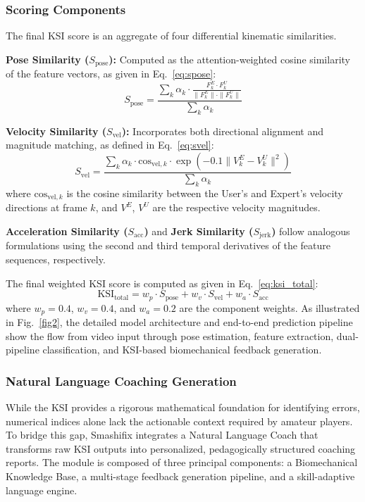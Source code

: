 \documentclass[pdflatex,sn-mathphys-num]{sn-jnl}
\theoremstyle{thmstyleone}%
\theoremstyle{thmstyletwo}%
\theoremstyle{thmstylethree}%
\begin{document}
\subsubsection{Scoring Components}
The final KSI score is an aggregate of four differential kinematic similarities.

\textbf{Pose Similarity ($S_{\text{pose}}$):} Computed as the attention-weighted cosine similarity of the feature vectors, as given in Eq.~\eqref{eq:spose}:
\begin{equation}
S_{\text{pose}} = \frac{\sum_{k}\alpha_{k} \cdot \frac{F_k^E \cdot F_k^U}{\|F_k^E\| \cdot \|F_k^U\|}}{\sum_{k}\alpha_{k}}
\label{eq:spose}
\end{equation}

\textbf{Velocity Similarity ($S_{\text{vel}}$):} Incorporates both directional alignment and magnitude matching, as defined in Eq.~\eqref{eq:svel}:
\begin{equation}
S_{\text{vel}} = \frac{\sum_{k}\alpha_{k} \cdot \text{cos}_{\text{vel},k} \cdot \exp(-0.1\|V_k^E - V_k^U\|^2)}{\sum_{k}\alpha_{k}}
\label{eq:svel}
\end{equation}
\noindent where $\text{cos}_{\text{vel},k}$ is the cosine similarity between the User's and Expert's velocity directions at frame $k$, and $V^E$, $V^U$ are the respective velocity magnitudes.

\textbf{Acceleration Similarity ($S_{\text{acc}}$)} and \textbf{Jerk Similarity ($S_{\text{jerk}}$)} follow analogous formulations using the second and third temporal derivatives of the feature sequences, respectively.

The final weighted KSI score is computed as given in Eq.~\eqref{eq:ksi_total}:
\begin{equation}
\text{KSI}_{\text{total}} = w_p \cdot S_{\text{pose}} + w_v \cdot S_{\text{vel}} + w_a \cdot S_{\text{acc}}
\label{eq:ksi_total}
\end{equation}
\noindent where $w_p = 0.4$, $w_v = 0.4$, and $w_a = 0.2$ are the component weights.
As illustrated in Fig.~\ref{fig2}, the detailed model architecture and end-to-end prediction pipeline show the flow from video input through pose estimation, feature extraction, dual-pipeline classification, and KSI-based biomechanical feedback generation.


\subsubsection{Natural Language Coaching Generation}
While the KSI provides a rigorous mathematical foundation for identifying errors, numerical indices alone lack the actionable context required by amateur players. To bridge this gap, Smashifix integrates a Natural Language Coach that transforms raw KSI outputs into personalized, pedagogically structured coaching reports. The module is composed of three principal components: a Biomechanical Knowledge Base, a multi-stage feedback generation pipeline, and a skill-adaptive language engine.
\end{document}
